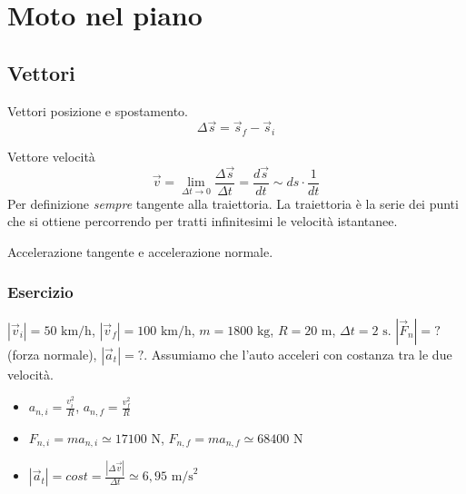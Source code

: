 \section{Moto nel piano}

\subsection{Vettori}
Vettori posizione e spostamento.
\[ \Delta\overrightarrow{s} = \overrightarrow{s}_f - \overrightarrow{s}_i \]

Vettore velocità
\[ \overrightarrow{v} = \lim_{\Delta t \to 0}\frac{\Delta\overrightarrow{s}}{\Delta t} = \frac{d\overrightarrow{s}}{dt} \sim ds\cdot\frac{1}{dt} \]
Per definizione \textit{sempre} tangente alla traiettoria. La traiettoria
è la serie dei punti che si ottiene percorrendo per tratti infinitesimi le
velocità istantanee.

Accelerazione tangente e accelerazione normale.


\subsubsection*{Esercizio}
$|\overrightarrow{v}_i| = 50\text{ km/h}$, $|\overrightarrow{v}_f| = 100\text{ km/h}$,
$m = 1800\text{ kg}$, $R = 20\text{ m}$, $\Delta t = 2\text{ s}$. $|\overrightarrow{F}_n| = ?$ (forza normale),
$|\overrightarrow{a}_t| = ?$. Assumiamo che l'auto acceleri con costanza tra le
due velocità.

\begin{itemize}
    \item $a_{n,i} = \frac{v_i^2}{R}$, $a_{n,f} = \frac{v_f^2}{R}$
    \item $F_{n,i} = ma_{n,i} \simeq 17100 \text{ N}$, $F_{n,f} = ma_{n,f} \simeq 68400\text{ N}$
    \item $|\overrightarrow{a}_t| = \textit{cost} = \frac{|\Delta\overrightarrow{v}|}{\Delta t} \simeq 6,95\text{ m/s}^2$
\end{itemize}